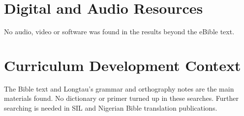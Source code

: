\documentclass[12pt]{article}
\begin{document}
\section{Digital and Audio Resources}
No audio, video or software was found in the results beyond the eBible text.

\section{Curriculum Development Context}
The Bible text and Longtau's grammar and orthography notes are the main materials found. No dictionary or primer turned up in these searches. Further searching is needed in SIL and Nigerian Bible translation publications.
\end{document}
